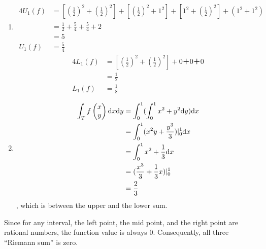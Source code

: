 \documentclass{homework}
\begin{document}
\begin{problem}{2}
\begin{enumerate}
\item
\begin{align*}
4U_1(f) &= [(\frac{1}{2})^2 + (\frac{1}{2})^2] + [(\frac{1}{2})^2 + 1^2]
         + [1^2 + (\frac{1}{2})^2] + (1^2 + 1^2) \\
        &= \frac{1}{2} + \frac{5}{4} + \frac{5}{4} + 2 \\
        &= 5 \\
 U_1(f) &= \frac{5}{4}
\end{align*}
\begin{align*}
4L_1(f) &= [(\frac{1}{2})^2 + (\frac{1}{2})^2] + 0 ＋ 0 ＋ 0 \\
        &= \frac{1}{2} \\
 L_1(f) &= \frac{1}{8}
\end{align*}

\item
\begin{align*}
\int_T f\begin{pmatrix}x\\y\end{pmatrix} \mathrm{d}x \mathrm{d}y
&= \int_0^1(\int_0^1 x^2+y^2 \mathrm{d}y) \mathrm{d}x \\
&= \int_0^1 (x^2y + \frac{y^3}{3}) |_0^1 \mathrm{d}x \\
&= \int_0^1 x^2 + \frac{1}{3} \mathrm{d}x \\
&= (\frac{x^3}{3} + \frac{1}{3}x)|_0^1 \\
&= \frac{2}{3}
\end{align*}
, which is between the upper and the lower sum.
\end{enumerate}
\end{problem}

\begin{problem}{3}
Since for any interval, the left point, the mid point, and the right point are
rational numbers, the function value is always 0. Consequently, all three
``Riemann sum'' is zero.
\end{problem}
\end{document}
